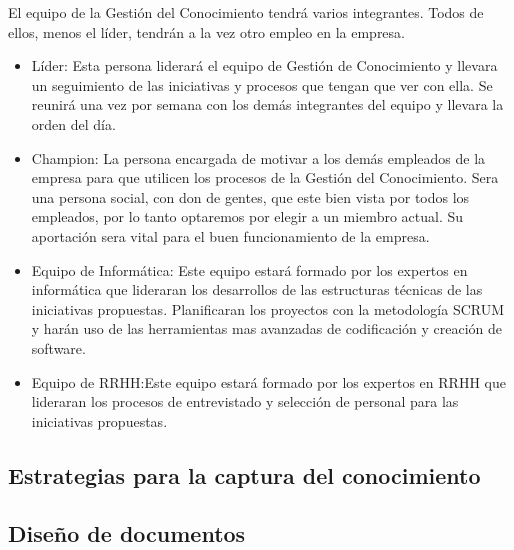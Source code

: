 \documentclass[twoside]{article}
\begin{document}
El equipo de la Gestión del Conocimiento tendrá varios integrantes. Todos de ellos, menos el líder, tendrán a la vez otro empleo en la empresa.
\begin{itemize}
	\item Líder: Esta persona liderará el equipo de Gestión de Conocimiento y llevara un seguimiento de las iniciativas y procesos que tengan que ver con ella. Se reunirá una vez por semana con los demás integrantes del equipo y llevara la orden del día.
	
	\item Champion: La persona encargada de motivar a los demás empleados de la empresa para que utilicen los procesos de la Gestión del Conocimiento. Sera una persona social, con don de gentes, que este bien vista por todos los empleados, por lo tanto optaremos por elegir a un miembro actual. Su aportación sera vital para el buen funcionamiento de la empresa.
	
	\item Equipo de Informática: Este equipo estará formado por los expertos en informática que lideraran los desarrollos de las estructuras técnicas de las iniciativas propuestas. Planificaran los proyectos con la metodología SCRUM y harán uso de las herramientas mas avanzadas de codificación y creación de software.
	
	\item Equipo de RRHH:Este equipo estará formado por los expertos en RRHH que lideraran los procesos de entrevistado y selección de personal para las iniciativas propuestas.
\end{itemize}


\subsection{Estrategias para la captura del conocimiento}





\subsection{Diseño de documentos}
\end{document}
